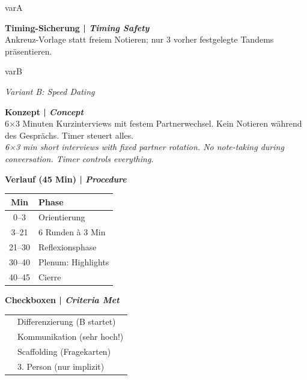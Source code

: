 \documentclass[11pt, a4paper]{article}
\newcommand{\en}[1]{{\small\color{english}\textit{#1}}}
\newcommand{\cmark}{\textcolor{success}{\ding{51}}}
\newcommand{\xmark}{\textcolor{spanisch}{\ding{55}}}
\newcommand{\risikoniedrig}{\colorbox{success!20}{\textcolor{success}{\scriptsize\textbf{NIEDRIG}}}}
\newcommand{\risikomittel}{\colorbox{warning!20}{\textcolor{warning}{\scriptsize\textbf{MITTEL}}}}
\newcommand{\score}[1]{\colorbox{spanisch!15}{\textcolor{spanisch}{\textbf{#1/10}}}}
\begin{document}
\begin{varbox}[title={\textcolor{varA}{VARIANTE A: Tandem-Interview mit Ankreuz-Vorlage} \hfill \score{9.4} \risikomittel}]{varA}
\begin{minipage}[t]{0.48\textwidth}
\vspace{0.2cm}

\textbf{Timing-Sicherung | \en{Timing Safety}}\\[0.1cm]
Ankreuz-Vorlage statt freiem Notieren; nur 3 vorher festgelegte Tandems präsentieren.
\end{minipage}

\end{varbox}

\vspace{0.4cm}


\begin{varbox}[title={\textcolor{varB}{VARIANTE B: Speed-Dating} \hfill \score{8.7} \risikoniedrig}]{varB}

\en{Variant B: Speed Dating}

\vspace{0.2cm}

\begin{minipage}[t]{0.48\textwidth}
\textbf{Konzept | \en{Concept}}\\[0.1cm]
6×3 Minuten Kurzinterviews mit festem Partnerwechsel. Kein Notieren während des Gesprächs. Timer steuert alles.\\[0.1cm]
\en{6×3 min short interviews with fixed partner rotation. No note-taking during conversation. Timer controls everything.}

\vspace{0.3cm}

\textbf{Verlauf (45 Min) | \en{Procedure}}\\[0.1cm]
\small
\begin{tabular}{|c|l|}
\hline
\rowcolor{varB!10}
\textbf{Min} & \textbf{Phase} \\
\hline
0--3 & Orientierung \\
3--21 & 6 Runden à 3 Min \\
21--30 & Reflexionsphase \\
30--40 & Plenum: Highlights \\
40--45 & Cierre \\
\hline
\end{tabular}
\end{minipage}
\hfill
\begin{minipage}[t]{0.48\textwidth}
\textbf{Checkboxen | \en{Criteria Met}}\\[0.1cm]
\begin{tabular}{ll}
\cmark & Differenzierung (B startet) \\
\cmark & Kommunikation (sehr hoch!) \\
\cmark & Scaffolding (Fragekarten) \\
\xmark & 3. Person (nur implizit) \\
\end{tabular}


\end{minipage}
\end{varbox}
\end{document}
